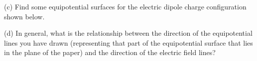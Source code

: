 (c) Find some equipotential surfaces for the electric dipole charge
configuration shown below.

\vspace{0.3cm}
{\centering {} \par}
\vspace{0.3cm}

(d) In general, what is the relationship between the direction of
the equipotential lines you have drawn (representing that part of
the equipotential surface that lies in the plane of the paper) and
the direction of the electric field lines?\vspace{15mm}

